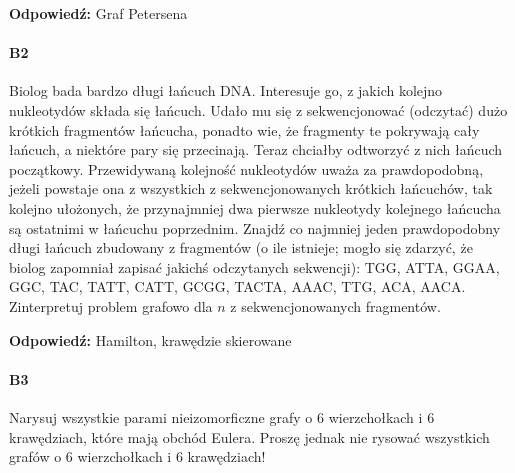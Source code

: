 \documentclass[a4paper,12pt]{article}
\theoremstyle{definition}%
\theoremstyle{definition}
\theoremstyle{problem}
\begin{document}
\textbf{Odpowiedź: }Graf Petersena
\paragraph{B2} Biolog bada bardzo długi łańcuch DNA. Interesuje go, z jakich kolejno nukleotydów składa się łańcuch. Udało mu się z sekwencjonować (odczytać) dużo krótkich fragmentów łańcucha, ponadto wie, że fragmenty te pokrywają cały łańcuch, a niektóre pary się przecinają. Teraz chciałby odtworzyć z nich łańcuch początkowy. Przewidywaną kolejność nukleotydów uważa za prawdopodobną, jeżeli powstaje ona z wszystkich z sekwencjonowanych krótkich łańcuchów, tak kolejno ułożonych, że przynajmniej dwa pierwsze nukleotydy kolejnego łańcucha są ostatnimi w łańcuchu poprzednim. Znajdź co najmniej jeden prawdopodobny długi łańcuch zbudowany z fragmentów (o ile istnieje; mogło się zdarzyć, że biolog zapomniał zapisać jakichś odczytanych sekwencji): TGG, ATTA, GGAA, GGC, TAC, TATT, CATT, GCGG, TACTA, AAAC, TTG, ACA, AACA.
Zinterpretuj problem grafowo dla $n$ z sekwencjonowanych fragmentów.

\textbf{Odpowiedź: }Hamilton, krawędzie skierowane
\paragraph{B3} Narysuj wszystkie parami nieizomorficzne grafy o $6$ wierzchołkach i $6$ krawędziach, które mają obchód Eulera. Proszę jednak nie rysować wszystkich grafów o $6$ wierzchołkach i $6$ krawędziach!
\end{document}
